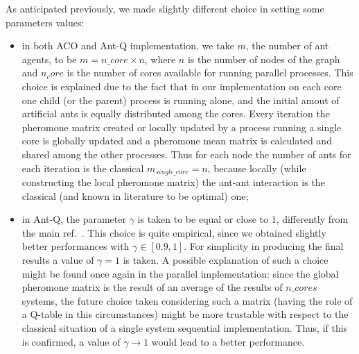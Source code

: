 \documentclass[10pt]{article}
\begin{document}
As anticipated previously, we made slightly different choice in setting some parameters values:
\begin{itemize}
\item in both ACO and Ant-Q implementation, we take $m$, the number of ant agents, to be $m=n\_core\times n$, where $n$ is the number of nodes of the graph and $n_core$ is the number of cores available for running parallel processes.
This choice is explained due to the fact that in our implementation on each core one child (or the parent) process is running alone, and the initial amout of artificial ants is equally distributed among the cores. Every iteration the pheromone matrix created or locally updated by a process running a single core is globally updated and a pheromone mean matrix is calculated and shared among the other processes. Thus for each node the number of ants for each iteration is the classical $m_{single\_core}=n$, because locally (while constructing the local pheromone matrix) the ant-ant interaction is the classical (and known in literature to be optimal) one;
\item in Ant-Q, the parameter $\gamma$ is taken to be equal or close to $1$, differently from the main ref.~\cite{undici}. This choice is quite empirical, since we obtained slightly better performances with $\gamma \in [0.9,1]$. For simplicity in producing the final results a value of $\gamma=1$ is taken. A possible explanation of such a choice might be found once again in the parallel implementation: since the global pheromone matrix is the result of an average of the results of $n\_cores$ systems, the future choice taken considering such a matrix (having the role of a Q-table in this circumstances) might be more trustable with respect to the classical situation of a single system sequential implementation. Thus, if this is confirmed, a value of $\gamma \rightarrow 1$ would lead to a better performance.
\end{itemize}
\end{document}
